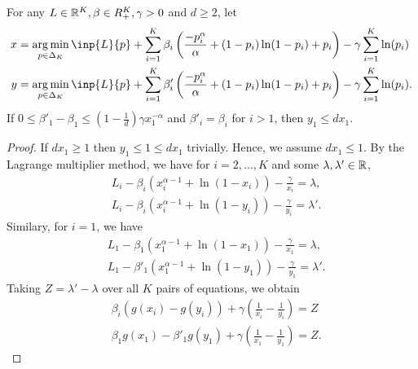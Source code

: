 \begin{lemma}
For any $L \in \mathbb{R}^K, \beta \in R^K_{+}, \gamma > 0$ and $d \geq 2$, let 
\begin{align*}
    x &= \argmin_{p \in \Delta_K} \inp{L}{p} + \sum_{i=1}^K \beta_i \left(\frac{-p_i^\alpha}{\alpha} + (1-p_i)\ln(1-p_i) + p_i\right) - \gamma \sum_{i=1}^K \ln(p_i) \\
    y &= \argmin_{p \in \Delta_K} \inp{L}{p} + \sum_{i=1}^K \beta'_i \left(\frac{-p_i^\alpha}{\alpha} + (1-p_i)\ln(1-p_i) + p_i\right) - \gamma \sum_{i=1}^K \ln(p_i).
\end{align*}
If $0 \leq \beta'_1 - \beta_1 \leq \left(1-\frac{1}{d}\right)\gamma x_1^{-\alpha}$ and $\beta'_i = \beta_i$ for $i > 1$, then $y_1 \leq dx_1$.
\label{lemma:CoordinateWiseSPMSameLossDiffBeta}
\end{lemma}
\begin{proof}
    If $dx_1 \geq 1$ then $y_1 \leq 1 \leq dx_1$ trivially. Hence, we assume $dx_1 \leq 1$. By the Lagrange multiplier method, we have for $i = 2, \dots, K$ and some $\lambda, \lambda' \in \mathbb{R}$,
    \begin{align*}
        & L_i - \beta_i(x_i^{\alpha-1} + \ln(1-x_i)) - \frac{\gamma}{x_i} = \lambda, \\
        & L_i - \beta_i(x_i^{\alpha-1} + \ln(1-y_i)) - \frac{\gamma}{y_i} = \lambda'.
    \end{align*}
    Similary, for $i = 1$, we have
    \begin{align*}
        & L_1 - \beta_1(x_1^{\alpha-1} + \ln(1-x_1)) - \frac{\gamma}{x_1} = \lambda, \\
        & L_1 - \beta'_1(x_1^{\alpha-1} + \ln(1-y_1)) - \frac{\gamma}{y_1} = \lambda'.
    \end{align*}
    Taking $Z = \lambda' - \lambda$ over all $K$ pairs of equations, we obtain
    \begin{align}
        & \beta_i (g(x_i) - g(y_i)) + \gamma\left(\frac{1}{x_i} - \frac{1}{y_i}\right) = Z \\
        & \beta_1 g(x_1) - \beta'_1 g(y_1) + \gamma \left(\frac{1}{x_1} - \frac{1}{y_1}\right) = Z.
        \label{eq:CoordinateWiseSPMLagrangeDiffSameLossDiffBeta}
    \end{align}
    

\end{proof}
